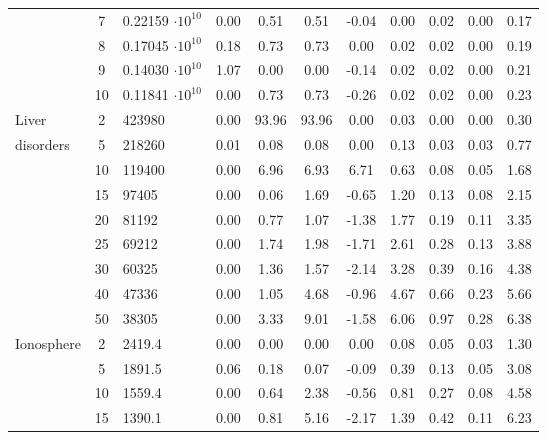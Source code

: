 {\begin{longtable}{@{}lclcccccccc@{}}
                      & 7  & 0.22159 $\cdot 10^{10}$ & 0.00    & 0.51  & 0.51  & -0.04 & 0.00    & 0.02 & 0.00 & 0.17  \\
                      & 8  & 0.17045 $\cdot 10^{10}$ & 0.18    & 0.73  & 0.73  & 0.00  & 0.02    & 0.02 & 0.00 & 0.19  \\
                      & 9  & 0.14030 $\cdot 10^{10}$ & 1.07    & 0.00  & 0.00  & -0.14 & 0.02    & 0.02 & 0.00 & 0.21  \\
                      & 10 & 0.11841 $\cdot 10^{10}$ & 0.00    & 0.73  & 0.73  & -0.26 & 0.02    & 0.02 & 0.00 & 0.23  \\ \hline
Liver                 & 2  & 423980          & 0.00    & 93.96 & 93.96 & 0.00  & 0.03    & 0.00 & 0.00 & 0.30  \\
disorders             & 5  & 218260          & 0.01    & 0.08  & 0.08  & 0.00  & 0.13    & 0.03 & 0.03 & 0.77  \\
                      & 10 & 119400          & 0.00    & 6.96  & 6.93  & 6.71  & 0.63    & 0.08 & 0.05 & 1.68  \\
                      & 15 & 97405           & 0.00    & 0.06  & 1.69  & -0.65 & 1.20    & 0.13 & 0.08 & 2.15  \\
                      & 20 & 81192           & 0.00    & 0.77  & 1.07  & -1.38 & 1.77    & 0.19 & 0.11 & 3.35  \\
                      & 25 & 69212           & 0.00    & 1.74  & 1.98  & -1.71 & 2.61    & 0.28 & 0.13 & 3.88  \\
                      & 30 & 60325           & 0.00    & 1.36  & 1.57  & -2.14 & 3.28    & 0.39 & 0.16 & 4.38  \\
                      & 40 & 47336           & 0.00    & 1.05  & 4.68  & -0.96 & 4.67    & 0.66 & 0.23 & 5.66  \\
                      & 50 & 38305           & 0.00    & 3.33  & 9.01  & -1.58 & 6.06    & 0.97 & 0.28 & 6.38  \\ \hline
Ionosphere            & 2  & 2419.4          & 0.00    & 0.00  & 0.00  & 0.00  & 0.08    & 0.05 & 0.03 & 1.30  \\
                      & 5  & 1891.5          & 0.06    & 0.18  & 0.07  & -0.09 & 0.39    & 0.13 & 0.05 & 3.08  \\
                      & 10 & 1559.4          & 0.00    & 0.64  & 2.38  & -0.56 & 0.81    & 0.27 & 0.08 & 4.58  \\
                      & 15 & 1390.1          & 0.00    & 0.81  & 5.16  & -2.17 & 1.39    & 0.42 & 0.11 & 6.23  \\

\end{longtable}}
